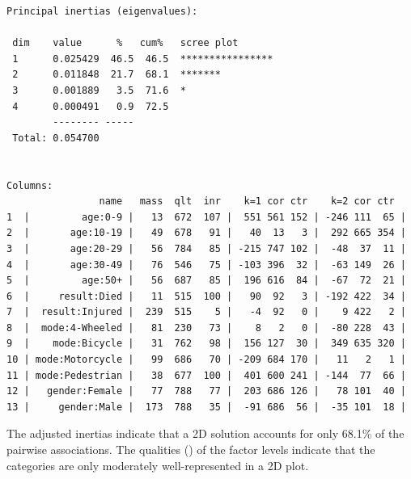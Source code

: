 \documentclass[10pt]{report}\usepackage[]{graphicx}\usepackage[]{color}
\makeatletter
\newenvironment{kframe}{%
 \def\at@end@of@kframe{}%
 \ifinner\ifhmode%
  \def\at@end@of@kframe{\end{minipage}}%
  \begin{minipage}{\columnwidth}%
 \fi\fi%
 \def\FrameCommand##1{\hskip\@totalleftmargin \hskip-\fboxsep
 \colorbox{shadecolor}{##1}\hskip-\fboxsep
     \hskip-\linewidth \hskip-\@totalleftmargin \hskip\columnwidth}%
 \MakeFramed {\advance\hsize-\width
   \@totalleftmargin\z@ \linewidth\hsize
   \@setminipage}}%
 {\par\unskip\endMakeFramed%
 \at@end@of@kframe}
\newenvironment{knitrout}{}{} %
\renewenvironment{knitrout}{\small\renewcommand{\baselinestretch}{.85}}{} %
\makeatother
\begin{document}
\begin{Exercises}
\begin{enumerate*}
\begin{ans}
\begin{knitrout}
\begin{kframe}
\begin{verbatim}
Principal inertias (eigenvalues):

 dim    value      %   cum%   scree plot               
 1      0.025429  46.5  46.5  ****************         
 2      0.011848  21.7  68.1  *******                  
 3      0.001889   3.5  71.6  *                        
 4      0.000491   0.9  72.5                           
        -------- -----                                 
 Total: 0.054700                                       


Columns:
                name   mass  qlt  inr    k=1 cor ctr    k=2 cor ctr  
1  |         age:0-9 |   13  672  107 |  551 561 152 | -246 111  65 |
2  |       age:10-19 |   49  678   91 |   40  13   3 |  292 665 354 |
3  |       age:20-29 |   56  784   85 | -215 747 102 |  -48  37  11 |
4  |       age:30-49 |   76  546   75 | -103 396  32 |  -63 149  26 |
5  |         age:50+ |   56  687   85 |  196 616  84 |  -67  72  21 |
6  |     result:Died |   11  515  100 |   90  92   3 | -192 422  34 |
7  |  result:Injured |  239  515    5 |   -4  92   0 |    9 422   2 |
8  |  mode:4-Wheeled |   81  230   73 |    8   2   0 |  -80 228  43 |
9  |    mode:Bicycle |   31  762   98 |  156 127  30 |  349 635 320 |
10 | mode:Motorcycle |   99  686   70 | -209 684 170 |   11   2   1 |
11 | mode:Pedestrian |   38  677  100 |  401 600 241 | -144  77  66 |
12 |   gender:Female |   77  788   77 |  203 686 126 |   78 101  40 |
13 |     gender:Male |  173  788   35 |  -91 686  56 |  -35 101  18 |
\end{verbatim}
\end{kframe}
\end{knitrout}
    The adjusted inertias indicate that a 2D solution accounts for only 68.1\% of
    the pairwise associations. The qualities () of the factor levels indicate
    that the categories are only moderately well-represented in a 2D plot.
    \end{ans}
    

\end{enumerate*}
\end{Exercises}
\end{document}

